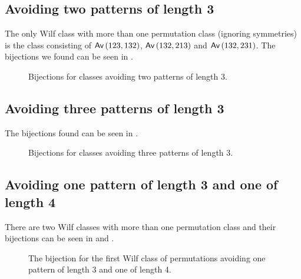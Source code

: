\subsection{Avoiding two patterns of length 3}
The only Wilf class with more than one permutation class (ignoring symmetries) is the class consisting of $\textsf{Av}\left(123,132\right)$, $\textsf{Av}\left(132,213\right)$ and $\textsf{Av}\left(132,231\right)$. The bijections we found can be seen in .

\begin{figure}[ht!]
    \centering
{}
    \caption{Bijections for classes avoiding two patterns of length $3$.}
    \label{fig:2x3bi}
\end{figure}

\subsection{Avoiding three patterns of length 3}
The bijections found can be seen in . 
\begin{figure}[ht!]
    \centering
{}
    \caption{Bijections for classes avoiding three patterns of length $3$.}
    \label{fig:3x3bi}
\end{figure}


\subsection{Avoiding one pattern of length 3 and one of length 4}
There are two Wilf classes with more than one permutation class and their bijections can be seen in  and .

\begin{figure}[ht!]
    \centering
    \caption{The bijection for the first Wilf class of permutations avoiding one pattern of length 3 and one of length 4.}
    \label{fig:1x31x4bi_1}
\end{figure}

